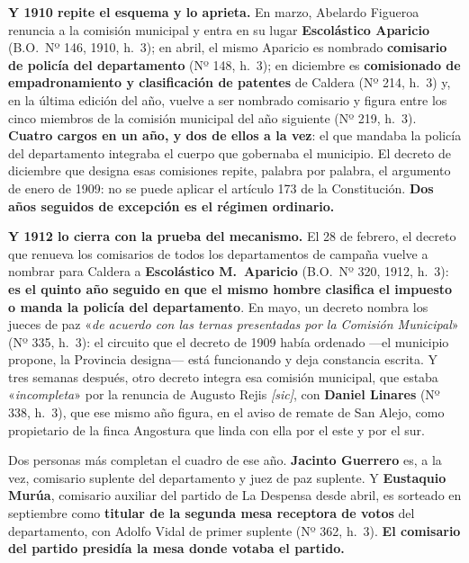 \textbf{Y 1910 repite el esquema y lo aprieta.} En marzo, Abelardo Figueroa
renuncia a la comisión municipal y entra en su lugar \textbf{Escolástico
Aparicio} (B.O.\ Nº 146, 1910, h.\ 3); en abril, el mismo Aparicio es nombrado
\textbf{comisario de policía del departamento} (Nº 148, h.\ 3); en diciembre es \textbf{comisionado de
empadronamiento y clasificación de patentes} de Caldera (Nº 214, h.\ 3) y, en la última edición del año, vuelve a ser nombrado comisario y
figura entre los cinco miembros de la comisión municipal del año siguiente (Nº 219, h.\ 3). \textbf{Cuatro
cargos en un año, y dos de ellos a la vez}: el que mandaba la policía del departamento
integraba el cuerpo que gobernaba el municipio. El decreto de diciembre que designa esas
comisiones repite, palabra por palabra, el argumento de enero de 1909: no se puede aplicar el
artículo 173 de la Constitución. \textbf{Dos años seguidos de excepción es el régimen
ordinario.}

\textbf{Y 1912 lo cierra con la prueba del mecanismo.} El 28 de febrero, el decreto que renueva
los comisarios de todos los departamentos de campaña vuelve a nombrar para Caldera a
\textbf{Escolástico M.\ Aparicio} (B.O.\ Nº 320, 1912, h.\ 3):
\textbf{es el quinto año seguido en que el mismo hombre clasifica el impuesto o manda la
policía del departamento}. En mayo, un decreto nombra los jueces de paz «\textit{de acuerdo con
las ternas presentadas por la Comisión Municipal}» (Nº 335, h.\ 3): el circuito que el decreto
de 1909 había ordenado ---el municipio propone, la Provincia designa--- está funcionando y deja
constancia escrita. Y tres semanas después, otro decreto integra esa comisión municipal, que
estaba «\textit{incompleta}» por la renuncia de Augusto Rejis
\textit{[sic]}, con \textbf{Daniel Linares} (Nº 338, h.\ 3), que ese mismo
año figura, en el aviso de remate de San Alejo, como propietario de la finca Angostura que linda
con ella por el este y por el sur.

Dos personas más completan el cuadro de ese año. \textbf{Jacinto Guerrero} es, a la vez, comisario suplente del departamento y juez de paz suplente. Y
\textbf{Eustaquio Murúa}, comisario auxiliar del partido de La Despensa
desde abril, es sorteado en septiembre como \textbf{titular de la segunda mesa receptora de votos}
del departamento, con Adolfo Vidal de primer suplente (Nº 362, h.\ 3). \textbf{El comisario del
partido presidía la mesa donde votaba el partido.}

